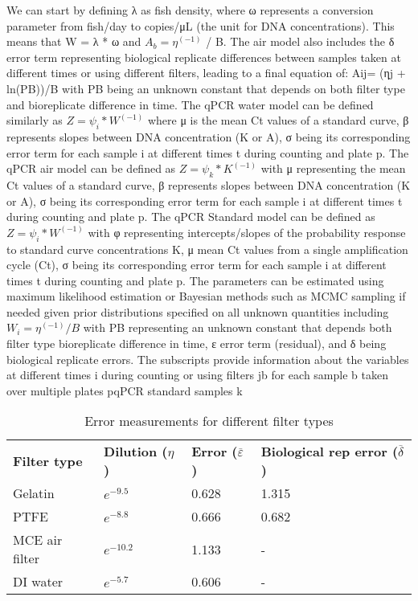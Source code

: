 \documentclass{article}
\begin{document}
We can start by defining λ as fish density, where ω represents a conversion parameter from fish/day to copies/μL (the unit for DNA concentrations). This means that W = λ * ω and $A_b = η^(-1)$ / B. The air model also includes the δ error term representing biological replicate differences between samples taken at different times or using different filters, leading to a final equation of:
Aij= (ηj + ln(PB))/B with PB being an unknown constant that depends on both filter type and bioreplicate difference in time. The qPCR water model can be defined similarly as $Z = ψ_i * W^(-1)$ where μ is the mean Ct values of a standard curve, β represents slopes between DNA concentration (K or A), σ being its corresponding error term for each sample i at different times t during counting and plate p. The qPCR air model can be defined as $Z = ψ_k * K^(-1)$ with μ representing the mean Ct values of a standard curve, β represents slopes between DNA concentration (K or A), σ being its corresponding error term for each sample i at different times t during counting and plate p. The qPCR Standard model can be defined as $Z = ψ_i * W^(-1)$ with φ representing intercepts/slopes of the probability response to standard curve concentrations K, μ mean Ct values from a single amplification cycle (Ct), σ being its corresponding error term for each sample i at different times t during counting and plate p. The parameters can be estimated using maximum likelihood estimation or Bayesian methods such as MCMC sampling if needed given prior distributions specified on all unknown quantities including $W_i = η^(-1) / B$ with PB representing an unknown constant that depends both filter type bioreplicate difference in time, ε error term (residual), and δ being biological replicate errors. The subscripts provide information about the variables at different times i during counting or using filters jb for each sample b taken over multiple plates pqPCR standard samples k

\begin{table}[h]
    \centering
    \begin{tabular}{llll}
        \textbf{Filter type} & \textbf{Dilution ($\eta$)} & \textbf{Error 
        ($\overline\varepsilon$)} & \textbf{Biological rep error ($\overline\delta$)} \\
        Gelatin & $e^{-9.5}$ & 0.628 & 1.315 \\
        PTFE & $e^{-8.8}$ & 0.666 & 0.682 \\
        MCE air filter & $e^{-10.2}$ & 1.133 & - \\
        DI water & $e^{-5.7}$ & 0.606 & - \\
    \end{tabular}
    \caption{Error measurements for different filter types}
    \label{tab:filter_error}
\end{table}
\end{document}
